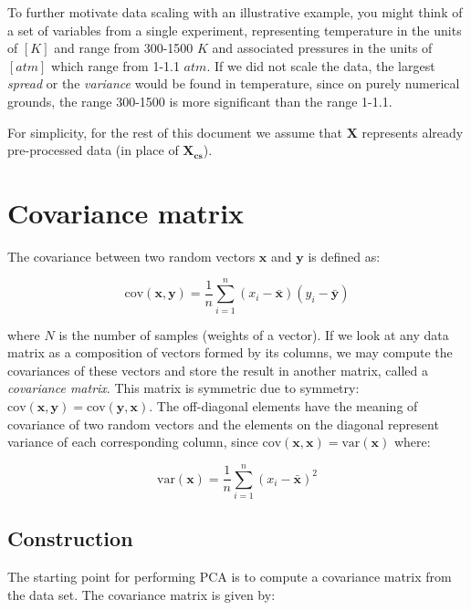 \documentclass[10pt,twocolumn]{article}
\begin{document}
To further motivate data scaling with an illustrative example, you might think of a set of variables from a single experiment, representing temperature in the units of $[K]$ and range from 300-1500 $K$ and associated pressures in the units of $[atm]$ which range from 1-1.1 $atm$. If we did not scale the data, the largest \textit{spread} or the \textit{variance} would be found in temperature, since on purely numerical grounds, the range 300-1500 is more significant than the range 1-1.1.

For simplicity, for the rest of this document we assume that $\bm{X}$ represents already pre-processed data (in place of $\bm{X_{cs}}$).

\section{Covariance matrix}

The covariance between two random vectors $\bm{x}$ and $\bm{y}$ is defined as:

\begin{equation}\label{eq:covariance-definition}
\text{cov}(\bm{x},\bm{y}) = \frac{1}{n} \sum_{i=1}^{n} (x_i - \bar{\bm{x}}) (y_i - \bar{\bm{y}})
\end{equation}

where $N$ is the number of samples (weights of a vector). If we look at any data matrix as a composition of vectors formed by its columns, we may compute the covariances of these vectors and store the result in another matrix, called a \textit{covariance matrix}. This matrix is symmetric due to symmetry: $\text{cov}(\bm{x},\bm{y}) = \text{cov}(\bm{y},\bm{x})$. The off-diagonal elements have the meaning of covariance of two random vectors and the elements on the diagonal represent variance of each corresponding column, since $\text{cov}(\bm{x},\bm{x}) = \text{var}(\bm{x})$ where:

\begin{equation}\label{eq:variance-definition}
\text{var}(\bm{x}) = \frac{1}{n} \sum_{i=1}^{n} (x_i - \bar{\bm{x}})^2
\end{equation}

\subsection{Construction}

The starting point for performing PCA is to compute a covariance matrix from the data set. The covariance matrix is given by:
\end{document}
